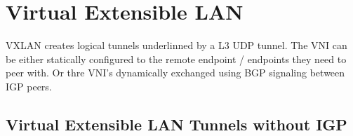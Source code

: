 \chapter[VXLAN]{Virtual Extensible LAN}

VXLAN creates logical tunnels underlinned by a L3 UDP tunnel.
The VNI can be either statically configured to the remote endpoint / endpoints they need to peer with.
Or thre VNI's dynamically exchanged using BGP signaling between IGP peers.

\section[VXLAN Tunnels]{Virtual Extensible LAN Tunnels without IGP}

